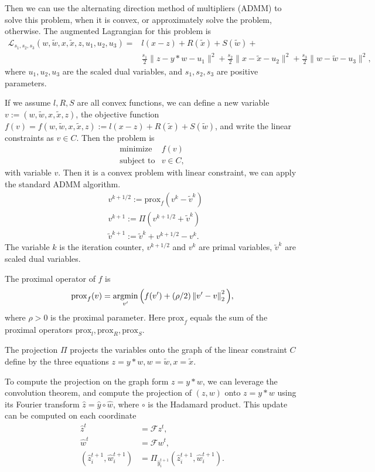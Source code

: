 \documentclass[12pt]{article}
\begin{document}
Then we can use the alternating direction method of multipliers (ADMM) to solve this problem,
when it is convex, or approximately solve the problem, otherwise.
The augmented Lagrangian for this problem is 
\[
\begin{array}{ll}
 \mathcal{L}_{s_1, s_2,s_3}(w, \tilde{w},x, \tilde{x}, z, u_1, u_2, u_3)=& l(x-z)+R(\tilde{x})+ S(\tilde{w})+\\
 & \frac{s_1}{2} \| z -y*w -u_1\|^2 +
 \frac{s_2}{2} \| x- \tilde{x}-u_2\|^2+
 \frac{s_3}{2} \| w- \tilde{w}-u_3\|^2,
\end{array}
\]
where $u_1, u_2, u_3$ are the scaled dual variables, and $s_1, s_2,s_3$ are positive parameters.

If we assume $l,R,S$ are all convex functions, we can define a new variable $v := (w, \tilde{w},x, \tilde{x}, z)$, 
the objective function $f(v) = f(w, \tilde{w},x, \tilde{x}, z):=l(x-z)+R(\tilde{x})+ S(\tilde{w})$, and write the linear constraints as $v\in C$. 
Then the problem is
\[
\begin{array}{ll}
\mbox{minimize}   & f(v) \\
\mbox{subject to} & v\in C,
\end{array}
\]
with variable $v$.
Then it is a convex problem with linear constraint, we can apply the standard ADMM algorithm. 
\[
\begin{array}{ll}
&v^{k+1/2} := \mathrm{prox}_{f}(v^{k}-\tilde{v}^{k})\\
&v^{k+1} :=  \Pi\left(v^{k+1/2}+\tilde{v}^k\right)\\
&\tilde{v}^{k+1} :=  \tilde{v}^k + v^{k+1/2} - v^k.
\end{array}
\]
The variable $k$ is the iteration counter, $v^{k+1/2}$ and $v^{k}$  are primal
variables, $\tilde{v}^k$ are scaled dual variables.

The proximal operator of $f$ is
\[
    \mathrm{prox}_{f}(v) = \mathop{\rm argmin}_{v'}\Big(f(v') + (\rho/2) \left\|v' - v\right\|_2^2\Big),
\]
where $\rho>0$ is the proximal parameter. Here $\mathrm{prox}_{f}$ equals the sum of the proximal operators $\mathrm{prox}_{l},\mathrm{prox}_{R},\mathrm{prox}_{S}$.

The projection $\Pi$ projects the variables onto the graph of the linear constraint $C$ define by the three equations $z = y*w, w = \tilde{w}, x = \tilde{x}$. 

To compute the projection on the graph form  $z = y*w$, we can leverage the convolution theorem, 
and compute the projection of $(z,w)$ onto $z = y*w$ using its Fourier transform  $\hat z =\hat y  \circ \hat w$, where $ \circ$ is the Hadamard product.  
This update can be computed on each coordinate
\[
\begin{array}{ll}
    \hat z^{t} &= \mathcal{F}  z^{t},\\
    \hat w^{t} &= \mathcal{F}  w^{t}, \\
 (\hat z^{t+1}_i, \hat w^{t+1}_i) &= \Pi_{\hat y^{t+1}_i}(\hat z^{t+1}_i, \hat w^{t+1}_i).
\end{array}
\]
\end{document}
